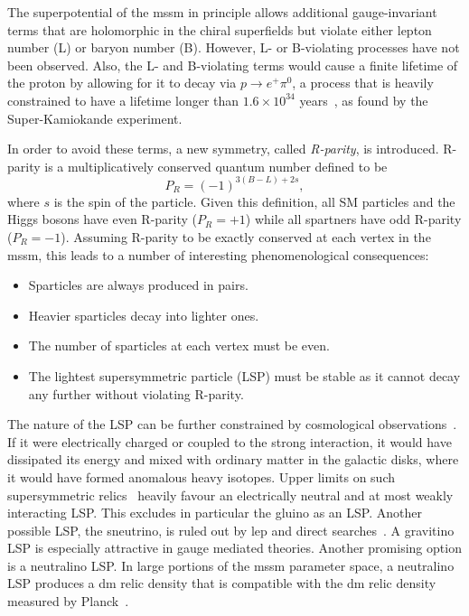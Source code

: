 The superpotential of the \gls{mssm} in principle allows additional gauge-invariant terms that are holomorphic in the chiral superfields but violate either lepton number (L) or baryon number (B). However, L- or B-violating processes have not been observed. Also, the L- and B-violating terms would cause a finite lifetime of the proton by allowing for it to decay \eg via $p\rightarrow e^+ \pi^0$, a process that is heavily constrained to have a lifetime longer than $1.6\times 10^{34}$ years~\cite{Miura:2016krn}, as found by the Super-Kamiokande experiment.

In order to avoid these terms, a new symmetry, called \textit{R-parity}, is introduced. R-parity is a multiplicatively conserved quantum number defined to be
\begin{equation}
	P_R = (-1)^{3(B-L)+2s},
	\label{eq:rparity}
\end{equation}
where $s$ is the spin of the particle. Given this definition, all SM particles and the Higgs bosons have even R-parity ($P_R = +1$) while all spartners have odd R-parity ($P_R = -1$). Assuming R-parity to be exactly conserved at each vertex in the \gls{mssm}, this leads to a number of interesting phenomenological consequences:
\begin{itemize}
	\item Sparticles are always produced in pairs.
	\item Heavier sparticles decay into lighter ones.
	\item The number of sparticles at each vertex must be even.
	\item The lightest supersymmetric particle (LSP) must be stable as it cannot decay any further without violating R-parity.	
\end{itemize}
The nature of the LSP can be further constrained by cosmological observations~\cite{Ellis:1998eh}. If it were electrically charged or coupled to the strong interaction, it would have dissipated its energy and mixed with ordinary matter in the galactic disks, where it would have formed anomalous heavy isotopes.
Upper limits on such supersymmetric relics~\cite{Ellis:1983ew} heavily favour an electrically neutral and at most weakly interacting LSP. This excludes in particular the gluino as an LSP.
Another possible LSP, the sneutrino, is ruled out by \gls{lep} and direct searches~\cite{PhysRevLett.61.510,PhysRevD.48.5505,Akerib:2005zy}. A gravitino LSP is especially attractive in gauge mediated theories. 
Another promising option is a neutralino LSP. In large portions of the \gls{mssm} parameter space, a neutralino LSP produces a \gls{dm} relic density that is compatible with the \gls{dm} relic density measured by Planck~\cite{Aghanim:2018eyx,Ellis:1983ew}.

